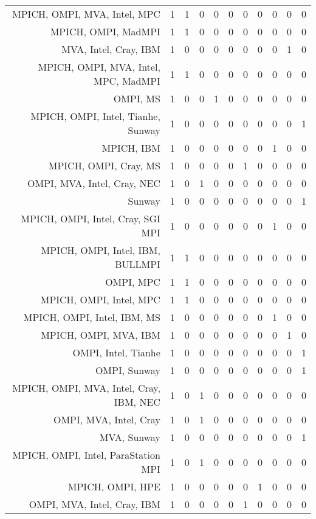 {\begin{landscape}
\begin{longtable}[htb]{r|c|c|c|c|c|c|c|c|c|c}
{MPICH, OMPI, MVA, Intel, MPC} & 1 & 1 & 0 & 0 & 0 & 0 & 0 & 0 & 0 & 0 \\%
{MPICH, OMPI, MadMPI} & 1 & 1 & 0 & 0 & 0 & 0 & 0 & 0 & 0 & 0 \\%
{MVA, Intel, Cray, IBM} & 1 & 0 & 0 & 0 & 0 & 0 & 0 & 0 & 1 & 0 \\%
{MPICH, OMPI, MVA, Intel, MPC, MadMPI} & 1 & 1 & 0 & 0 & 0 & 0 & 0 & 0 & 0 & 0 \\%
{OMPI, MS} & 1 & 0 & 0 & 1 & 0 & 0 & 0 & 0 & 0 & 0 \\%
{MPICH, OMPI, Intel, Tianhe, Sunway} & 1 & 0 & 0 & 0 & 0 & 0 & 0 & 0 & 0 & 1 \\%
{MPICH, IBM} & 1 & 0 & 0 & 0 & 0 & 0 & 0 & 1 & 0 & 0 \\%
{MPICH, OMPI, Cray, MS} & 1 & 0 & 0 & 0 & 0 & 1 & 0 & 0 & 0 & 0 \\%
{OMPI, MVA, Intel, Cray, NEC} & 1 & 0 & 1 & 0 & 0 & 0 & 0 & 0 & 0 & 0 \\%
{Sunway} & 1 & 0 & 0 & 0 & 0 & 0 & 0 & 0 & 0 & 1 \\%
{MPICH, OMPI, Intel, Cray, SGI MPI} & 1 & 0 & 0 & 0 & 0 & 0 & 0 & 1 & 0 & 0 \\%
{MPICH, OMPI, Intel, IBM, BULLMPI} & 1 & 1 & 0 & 0 & 0 & 0 & 0 & 0 & 0 & 0 \\%
{OMPI, MPC} & 1 & 1 & 0 & 0 & 0 & 0 & 0 & 0 & 0 & 0 \\%
{MPICH, OMPI, Intel, MPC} & 1 & 1 & 0 & 0 & 0 & 0 & 0 & 0 & 0 & 0 \\%
{MPICH, OMPI, Intel, IBM, MS} & 1 & 0 & 0 & 0 & 0 & 0 & 0 & 1 & 0 & 0 \\%
{MPICH, OMPI, MVA, IBM} & 1 & 0 & 0 & 0 & 0 & 0 & 0 & 0 & 1 & 0 \\%
{OMPI, Intel, Tianhe} & 1 & 0 & 0 & 0 & 0 & 0 & 0 & 0 & 0 & 1 \\%
{OMPI, Sunway} & 1 & 0 & 0 & 0 & 0 & 0 & 0 & 0 & 0 & 1 \\%
{MPICH, OMPI, MVA, Intel, Cray, IBM, NEC} & 1 & 0 & 1 & 0 & 0 & 0 & 0 & 0 & 0 & 0 \\%
{OMPI, MVA, Intel, Cray} & 1 & 0 & 1 & 0 & 0 & 0 & 0 & 0 & 0 & 0 \\%
{MVA, Sunway} & 1 & 0 & 0 & 0 & 0 & 0 & 0 & 0 & 0 & 1 \\%
{MPICH, OMPI, Intel, ParaStation MPI} & 1 & 0 & 1 & 0 & 0 & 0 & 0 & 0 & 0 & 0 \\%
{MPICH, OMPI, HPE} & 1 & 0 & 0 & 0 & 0 & 0 & 1 & 0 & 0 & 0 \\%
{OMPI, MVA, Intel, Cray, IBM} & 1 & 0 & 0 & 0 & 0 & 1 & 0 & 0 & 0 & 0 \\%

\end{longtable}
\end{landscape}}
